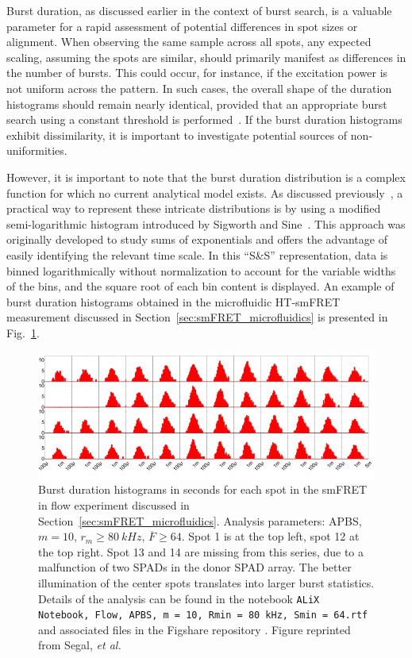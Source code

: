 Burst duration, as discussed earlier in the context of burst search, is a valuable parameter for a rapid assessment of potential differences in spot sizes or alignment. 
When observing the same sample across all spots, any expected scaling, assuming the spots are similar, should primarily manifest as differences in the number of bursts.
This could occur, for instance, if the excitation power is not uniform across the pattern. 
In such cases, the overall shape of the duration histograms should remain nearly identical, provided that an appropriate burst search using a constant threshold is performed~\cite{ingargiola_PLOS1_2016}. 
If the burst duration histograms exhibit dissimilarity, it is important to investigate potential sources of non-uniformities.

However, it is important to note that the burst duration distribution is a complex function for which no current analytical model exists. 
As discussed previously~\cite{ingargiola_PLOS1_2016}, a practical way to represent these intricate distributions is by using a modified semi-logarithmic histogram introduced by Sigworth and Sine~\cite{sigworth_BJ_1987}. 
This approach was originally developed to study sums of exponentials and offers the advantage of easily identifying the relevant time scale. 
In this \enquote{S\&S} representation, data is binned logarithmically without normalization to account for the variable widths of the bins, and the square root of each bin content is displayed. 
An example of burst duration histograms obtained in the microfluidic \ac{HT-smFRET} measurement discussed in Section~\ref{sec:smFRET_microfluidics} is presented in Fig.~\ref{fig:flow_burst_duration_48_spots}.

\begin{figure}
\centering
\includegraphics[width=\textwidth]{chapters/figures/flow_burst_duration_48_spots.jpg}
\caption{\label{fig:flow_burst_duration_48_spots}
Burst duration histograms in seconds for each spot in the \ac{smFRET} in flow experiment discussed
in Section~\ref{sec:smFRET_microfluidics}. 
Analysis parameters: \ac{APBS}, $m = 10$, $r_m \geq 80~kHz$, $\overline{F} \geq 64$. 
Spot 1 is at the top left, spot 12 at the top right. Spot 13 and 14 are missing from this series, due to a malfunction of two SPADs in the donor SPAD array. 
The better illumination of the center spots translates into larger burst statistics.
Details of the analysis can be found in the notebook \texttt{ALiX Notebook, Flow, \ac{APBS}, m = 10, Rmin = 80 kHz, Smin = 64.rtf}  and associated files in the Figshare repository \cite{figshare_repo_2019}.
Figure reprinted from Segal, \textit{et al.}~\cite{segal_methods_2019}
}
\end{figure}

